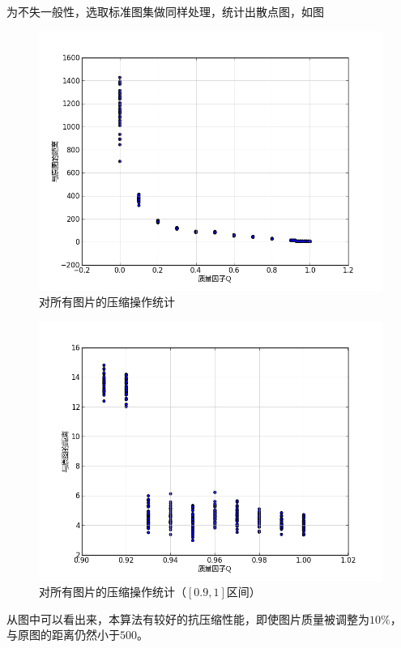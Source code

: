 为不失一般性，选取标准图集做同样处理，统计出散点图，如图
\begin{figure}[H]
  \centering
  \includegraphics[keepaspectratio=true,
  scale=0.6]{images/quality_all.png}
  \caption{对所有图片的压缩操作统计}
  \label{fig:quality-all-scatter-plot}
\end{figure}

\begin{figure}[H]
  \centering
  \includegraphics[keepaspectratio=true,
  scale=0.6]{images/quality_all_0.9_1.png}
  \caption{对所有图片的压缩操作统计（$[0.9, 1]$区间）}
  \label{fig:quality-gs0-sub-scatter-plot}
\end{figure}

从图中可以看出来，本算法有较好的抗压缩性能，即使图片质量被调整为$10\%$，
与原图的距离仍然小于$500$。

